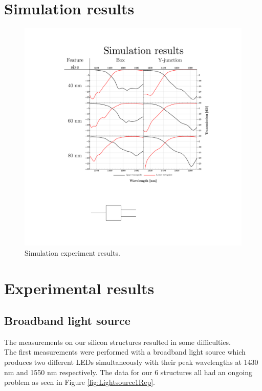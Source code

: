 \section{Simulation results}

\begin{figure}[H]
    \centering
    \includegraphics[width=1\textwidth]
    {fig/simplotssamlet.pdf}
    \caption{Simulation experiment results.}
\end{figure}

\section{Experimental results}

\subsection{Broadband light source}

The measurements on our silicon structures resulted in some difficulties. \\

The first measurements were performed with a broadband light source which produces two different LEDs simultaneously with their peak wavelengths at 1430 nm and 1550 nm respectively. The data for our 6 structures all had an ongoing problem as seen in Figure \ref{fig:Lightsource1Rep}. \\ 

